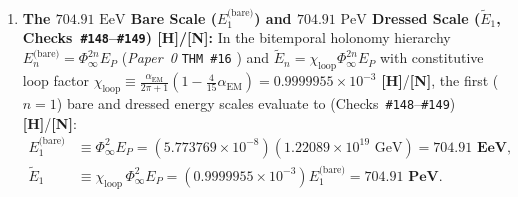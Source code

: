 \documentclass[11pt,a4paper]{article}
\newcommand{\catH}{\textbf{\textcolor{orange!85!black}{[H]}}}
\newcommand{\catN}{\textbf{\textcolor{teal!75!black}{[N]}}}
\theoremstyle{plain}
\theoremstyle{definition}
\theoremstyle{remark}
\numberwithin{equation}{section}
\begin{document}
\begin{enumerate}
    \item \textbf{The $704.91\text{ EeV}$ Bare Scale ($E_1^{\text{(bare)}}$) and $704.91\text{ PeV}$ Dressed Scale ($\widetilde{E}_1$, Checks~\texttt{\#148}--\texttt{\#149}) \catH/\catN:} In the bitemporal holonomy hierarchy $E_n^{\text{(bare)}} = \Phi_{\infty}^{2n} E_P$ (\textit{Paper~0} \texttt{THM~\#16} \cite{jimenez2026_p0}) and $\widetilde{E}_n = \chi_{\text{loop}}\Phi_{\infty}^{2n} E_P$ with constitutive loop factor $\chi_{\text{loop}} \equiv \frac{\alpha_{\text{EM}}}{2\pi + 1}\left(1 - \frac{4}{15}\alpha_{\text{EM}}\right) = 0.9999955 \times 10^{-3}$ \catH/\catN, the first ($n=1$) bare and dressed energy scales evaluate to (Checks~\texttt{\#148}--\texttt{\#149}) \catH/\catN:
    \begin{align}
    E_1^{\text{(bare)}} &\equiv \Phi_{\infty}^2 E_P = \left(5.773769 \times 10^{-8}\right) \left(1.22089 \times 10^{19}\text{ GeV}\right) = \mathbf{704.91\text{ EeV}}, \nonumber \\[3pt]
    \widetilde{E}_1 &\equiv \chi_{\text{loop}}\,\Phi_{\infty}^2 E_P = \left(0.9999955 \times 10^{-3}\right) E_1^{\text{(bare)}} = \mathbf{704.91\text{ PeV}}.
    \label{eq:703_pev_threshold}
    \end{align}
\end{enumerate}
\end{document}
